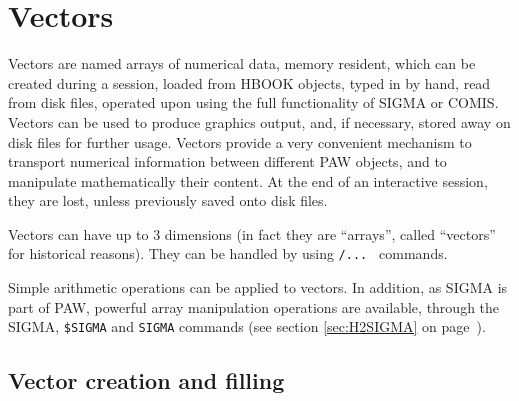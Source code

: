 
\chapter{Vectors}
\label{sec:H1PVECT}
 
Vectors are named arrays of numerical data, memory resident, which can be 
created during a session, loaded from HBOOK objects, typed in by hand, read 
from disk files, operated upon using the full functionality of SIGMA or COMIS.
Vectors can be used to produce graphics output, and, if necessary, stored away
on disk files for further usage. Vectors provide a very convenient mechanism to 
transport numerical information between different PAW objects, and to 
manipulate mathematically their content. At the end of an interactive session,
they are lost, unless previously saved onto disk files.
 
Vectors can have up to 3 dimensions (in fact they are ``arrays'',
called ``vectors'' for historical reasons).  They can be handled 
by using \texttt{/... } commands.
 
Simple arithmetic operations can be applied to vectors.
In addition, as SIGMA is part of PAW,
powerful array manipulation operations are available,
through the SIGMA, \texttt{\$SIGMA}
and  \texttt{SIGMA} commands 
(see section \ref{sec:H2SIGMA} on page~\pageref{sec:H2SIGMA}).
 
\section{Vector creation and filling}

